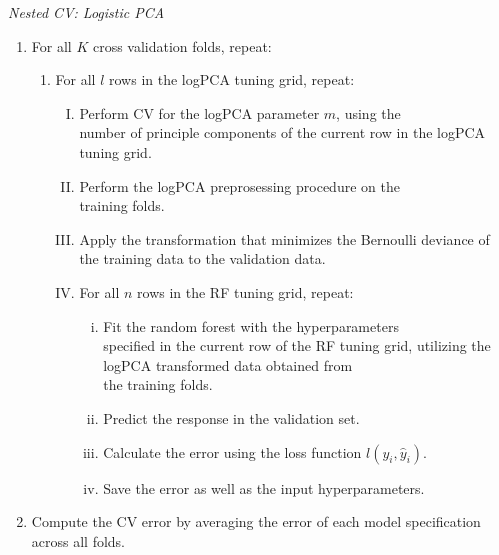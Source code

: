 \documentclass[a4paper,12pt, headsepline]{scrartcl}
\numberwithin{equation}{section}
\begin{document}
{\centering
	\begin{minipage}{.9\linewidth}
		\begin{algorithm}[H]
			\caption{\textit{Nested CV: Logistic PCA}}\label{alg:three}
			\begin{enumerate}
				\item For all $K$ cross validation folds, repeat:
					\begin{enumerate}
					\item For all $l$ rows in the logPCA tuning grid, repeat:
					\begin{enumerate}[I.]
						\item Perform CV for the logPCA parameter $m$, using the\\ number of principle components of the current row in the logPCA tuning grid.
						\item Perform the logPCA preprosessing procedure on the\\ training folds.
						\item Apply the transformation that minimizes the Bernoulli deviance of the training data to the validation data.
						\item For all $n$ rows in the RF tuning grid, repeat:
						\begin{enumerate}[i.]
							\item Fit the random forest with the hyperparameters\\ specified in the current row of the RF tuning grid, utilizing the logPCA transformed data obtained from\\ the training folds.
							\item Predict the response in the validation set.
							\item Calculate the error using the loss function $l(y_i, \hat y_i)$.
							\item Save the error as well as the input hyperparameters.
						\end{enumerate}
					\end{enumerate} 
				\end{enumerate}
			  \item Compute the CV error by averaging the error of each model specification across all folds.
			\end{enumerate}
		\end{algorithm}
	\end{minipage}
	\par
}
\end{document}
